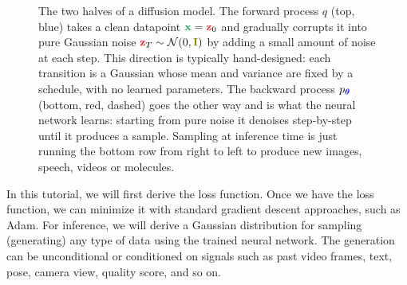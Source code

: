 \documentclass[usenames,dvipsnames]{article}
\newcommand{\myvec}[1]{\mathbf{#1}}
\newcommand{\myvecsym}[1]{\boldsymbol{#1}}
\newcommand{\vx}{\myvec{\textcolor{ForestGreen}{x}}}
\newcommand{\vz}{\myvec{\textcolor{Red}{z}}}
\newcommand{\vI}{\myvec{\textcolor{olive}{I}}}
\newcommand{\vtheta}{\myvecsym{\textcolor{blue}{\theta}}}
\newcommand{\gauss}{\mathcal{N}}
\begin{document}
\begin{figure}[h!]
{%
}
\caption{The two halves of a diffusion model. The forward process $q$ (top, blue) takes a clean datapoint $\vx=\vz_0$ and gradually corrupts it into pure Gaussian noise $\vz_T \sim \gauss(0, \vI)$ by adding a small amount of noise at each step. This direction is typically hand-designed: each transition is a Gaussian whose mean and variance are fixed by a schedule, with no learned parameters. The backward process $p_{\vtheta}$ (bottom, red, dashed) goes the other way and is what the neural network learns: starting from pure noise it denoises step-by-step until it produces a sample. Sampling at inference time is just running the bottom row from right to left to produce new images, speech, videos or molecules.}
\label{fig:simpleDiffusion}
\end{figure}

In this tutorial, we will first derive the loss function.
Once we have the loss function, we can minimize it with standard gradient descent approaches, such as Adam.
For inference, we will derive a Gaussian distribution for sampling (generating) any type of data using the trained neural network. The generation can be unconditional or conditioned on signals such as past video frames, text, pose, camera view, quality score, and so on.
\end{document}
